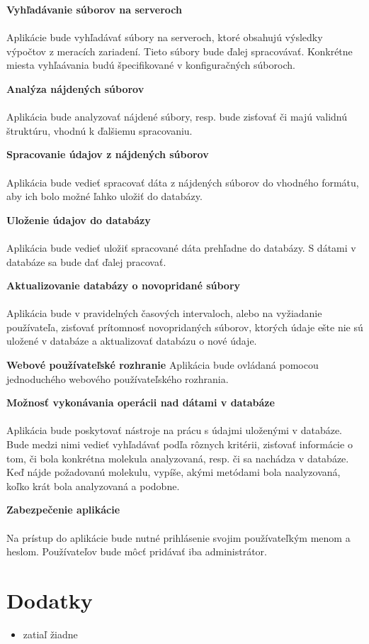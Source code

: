 \documentclass[12pt,a4paper]{article}
\begin{document}
\begin{enumerate}[label={[\arabic*]}]
	\item { \bf Vyhľadávanie súborov na serveroch } \\ \\
	Aplikácie bude vyhľadávať súbory na serveroch, ktoré obsahujú výsledky výpočtov z meracích zariadení. Tieto súbory bude ďalej spracovávať. Konkrétne miesta vyhľaávania budú špecifikované v konfiguračných súboroch.
	\item { \bf Analýza nájdených súborov } \\ \\
	Aplikácia bude analyzovať nájdené súbory, resp. bude zisťovať či majú validnú štruktúru, vhodnú k ďalšiemu spracovaniu.
	\item { \bf Spracovanie údajov z nájdených súborov } \\ \\
	Aplikácia bude vedieť spracovať dáta z nájdených súborov do vhodného formátu, aby ich bolo možné ľahko uložiť do databázy. 
	\item { \bf Uloženie údajov do databázy }\\ \\
	Aplikácia bude vedieť uložiť spracované dáta prehľadne do databázy. S dátami v databáze sa bude dať ďalej pracovať.
	\item { \bf Aktualizovanie databázy o novopridané súbory } \\ \\
	Aplikácia bude v pravidelných časových intervaloch, alebo na vyžiadanie používateľa,  zisťovať prítomnosť novopridaných súborov, ktorých údaje ešte nie sú uložené v databáze a aktualizovať databázu o nové údaje.
	\item { \bf  Webové používateľské rozhranie }
	Aplikácia bude ovládaná pomocou jednoduchého webového používateľského rozhrania.
	\item { \bf Možnosť vykonávania operácii nad dátami v databáze }\\ \\
	Aplikácia bude poskytovať nástroje na prácu s údajmi uloženými v databáze. Bude medzi nimi vedieť vyhľadávať podľa rôznych kritérii, zisťovať informácie o tom, či bola konkrétna molekula analyzovaná, resp. či sa nachádza v databáze. Keď nájde požadovanú molekulu, vypíše, akými metódami bola naalyzovaná, koľko krát bola analyzovaná a podobne.
	\item { \bf Zabezpečenie aplikácie } \\ \\
	Na prístup do aplikácie bude nutné prihlásenie svojim používateľkým menom a heslom. Používateľov bude môcť pridávať iba administrátor. 
	
\end{enumerate}

\section{Dodatky}
\begin{itemize}
	\item zatiaľ žiadne
\end{itemize}
\end{document}
